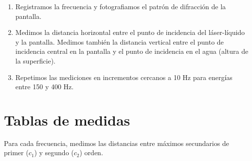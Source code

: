 \documentclass[a4paper,12pt,spanish]{article}
\begin{document}
\begin{enumerate}
		\item Registramos la frecuencia y fotografiamos el patrón de difracción de la pantalla. 
		
		\item Medimos la distancia horizontal entre el punto de incidencia del láser-líquido y la pantalla. Medimos también la distancia vertical entre el punto de incidencia central en la pantalla y el punto de incidencia en el agua (altura de la superficie).
		
		\item Repetimos las mediciones en incrementos cercanos a 10 Hz para energías entre 150 y 400 Hz.
	
	\end{enumerate}
	
	
	

	
	
	\section{Tablas de medidas}
	
	
	

	
	
	
	Para cada frecuencia, medimos las distancias entre máximos secundarios de primer ($c_1$) y segundo ($c_2$) orden.
	
\end{document}
